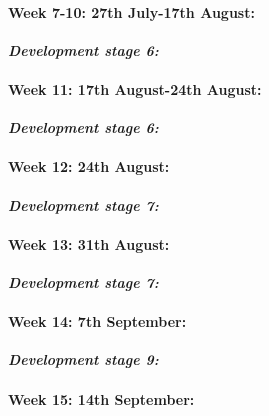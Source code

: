 \documentclass[a4paper, 11pt]{article}
\begin{document}

\paragraph{\textbf{Week 7-10: 27th July-17th August:}} \textbf{\emph{Development stage 6: }}



\paragraph{\textbf{Week 11: 17th August-24th August:	}} \textbf{\emph{Development stage 6: }}

\paragraph{\textbf{Week 12: 24th August:	}} \textbf{\emph{Development stage 7: }}

\paragraph{\textbf{Week 13: 31th August:	}} \textbf{\emph{Development stage 7: }}

\paragraph{\textbf{Week 14: 7th September:	}} \textbf{\emph{Development stage 9: }}

\paragraph{\textbf{Week 15: 14th September:	}} 

\fi
\clearpage
\end{document}
